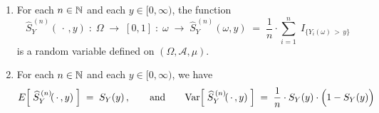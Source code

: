\vskip 0.5cm
\begin{proposition}
\mbox{}
\vskip 0.1cm
\noindent
\begin{enumerate}
\item
	For each $n \in \mathbb{N}$ and each $y \in [0,\infty)$, the function
	\begin{equation*}
	\widehat{S}_{Y}^{\,(n)}\!(\,\cdot\,,y) \;:\; \Omega \;\longrightarrow\; [0,1] \;:\;
		\omega \;\longrightarrow\; \widehat{S}^{\,(n)}_{Y}\!(\omega,y)
		\;=\; \dfrac{1}{n}\cdot\overset{n}{\underset{i=1}{\sum}}\;I_{\{Y_{i}(\omega) \,>\, y\}}
	\end{equation*}
	is a random variable defined on $(\Omega,\mathcal{A},\mu)$.
\item
	For each $n \in \mathbb{N}$ and each $y \in [0,\infty)$, we have
	\begin{equation*}
	E\!\left[\;\widehat{S}^{\,(n)}_{Y}\!(\,\cdot\,,y)\;\right] \; = \; S_{Y}(y)\,,
	\quad\quad\textnormal{and}\quad\quad
	\Var\!\left[\;\widehat{S}^{\,(n)}_{Y}\!(\,\cdot\,,y)\;\right] \; = \; \dfrac{1}{n} \cdot S_{Y}(y)\cdot\left(1\overset{{\color{white}.}}{-}S_{Y}(y)\right)
	\end{equation*}
\end{enumerate}
\end{proposition}


\renewcommand{\theenumi}{\roman{enumi}}
\renewcommand{\labelenumi}{\textnormal{(\theenumi)}$\;\;$}


